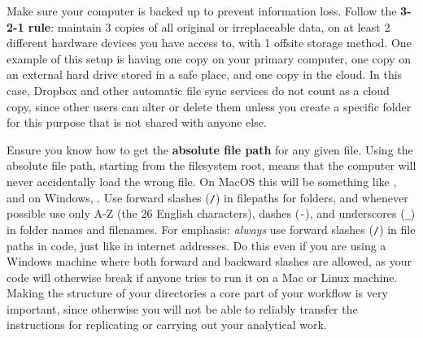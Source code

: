 Make sure your computer is backed up to prevent information loss.
Follow the \textbf{3-2-1 rule}: maintain 3 copies of all original or irreplaceable data,
on at least 2 different hardware devices you have access to,
with 1 offsite storage method.
One example of this setup is having one copy on your primary computer,
one copy on an external hard drive stored in a safe place,
and one copy in the cloud.
In this case, Dropbox and other automatic file sync services do not count as a cloud copy,
since other users can alter or delete them
unless you create a specific folder for this purpose that is not shared with anyone else.

Ensure you know how to get the \textbf{absolute file path} for any given file.
Using the absolute file path, starting from the filesystem root,
means that the computer will never accidentally load the wrong file.
On MacOS this will be something like ,
and on Windows, .
Use forward slashes (\texttt{/}) in filepaths for folders,
and whenever possible use only A-Z (the 26 English characters),
dashes (\texttt{-}), and underscores (\texttt{\_}) in folder names and filenames.
For emphasis: \textit{always} use forward slashes (\texttt{/}) in file paths in code,
just like in internet addresses. Do this even if you are using a Windows machine where
both forward and backward slashes are allowed, as your code will otherwise break
if anyone tries to run it on a Mac or Linux machine.
Making the structure of your directories a core part of your workflow is very important,
since otherwise you will not be able to reliably transfer the instructions
for replicating or carrying out your analytical work.

